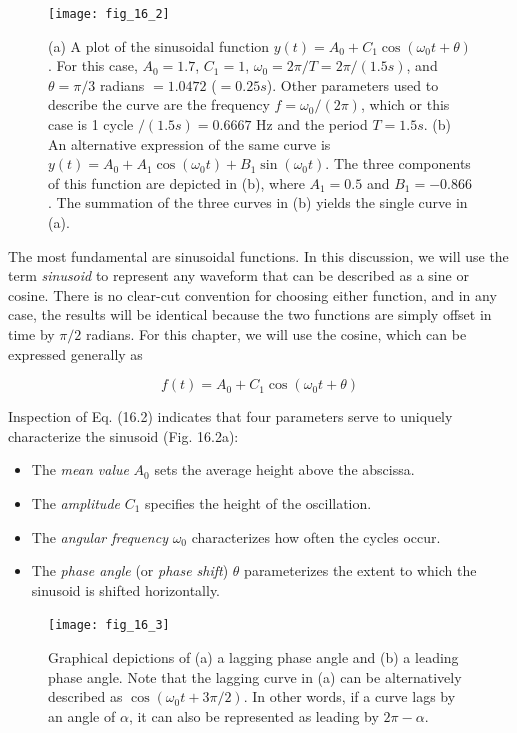 \documentclass[../main.tex]{subfiles}
\begin{document}
\begin{figure}[H]
	\centering
	\texttt{[image: fig\_16\_2]}
	\caption{\textsf{(a) A plot of the sinusoidal function $y(t) = A_0 + C_1 \cos(\omega_0 t + \theta)$. For this case, $A_0 = 1.7$, $C_1 = 1$, $\omega_0 = 2 \pi / T = 2 \pi / (1.5 s)$, and $\theta = \pi / 3$ radians $= 1.0472$ ($= 0.25 s$). Other	parameters used to describe the curve are the frequency $f = \omega_0 /(2\pi)$, which or this case is 1 cycle $/ (1.5 s) = 0.6667$ Hz and the period $T = 1.5 s$. (b) An alternative expression of the same curve is $y(t) = A_0 + A_1 \cos(\omega_0 t) + B_1 \sin(\omega_0 t)$. The three components of this function are depicted in (b), where $A_1 = 0.5$ and $B_1 = -0.866$. The summation of the three curves in (b) yields the single curve in (a).}}
	\label{fig:fig_16_2}
\end{figure}

The most fundamental are sinusoidal functions. In this discussion, we will use the term \textit{sinusoid} to represent any waveform that can be described as a sine or cosine. There is no clear-cut convention for choosing either function, and in any case, the results will be identical because the two functions are simply offset in time by $\pi/2$ radians. For this chapter, we will use the cosine, which can be expressed generally as

\begin{equation}
	\tag{16.2}
	f(t) = A_0 + C_1 \cos (\omega_0 t + \theta)
\end{equation}

\noindent Inspection of Eq. (16.2) indicates that four parameters serve to uniquely characterize the
sinusoid (Fig. 16.2a):

\begin{itemize}
	\item The \textit{mean value} $A_0$ sets the average height above the abscissa.
	\item The \textit{amplitude} $C_1$ specifies the height of the oscillation.
	\item The \textit{angular frequency} $\omega_0$ characterizes how often the cycles occur.
	\item The \textit{phase angle} (or \textit{phase shift}) $\theta$ parameterizes the extent to which the sinusoid is shifted horizontally.
\end{itemize}

\begin{figure}[H]
	\centering
	\texttt{[image: fig\_16\_3]}
	\caption{\textsf{Graphical depictions of (a) a lagging phase angle and (b) a leading phase angle. Note that the lagging curve in (a) can be alternatively described as $\cos(\omega_0 t + 3 \pi /2)$. In other words, if a curve lags by an angle of $\alpha$, it can also be represented as leading by $2\pi - \alpha$.}}
	\label{fig:fig_16_3}
\end{figure}
\end{document}

